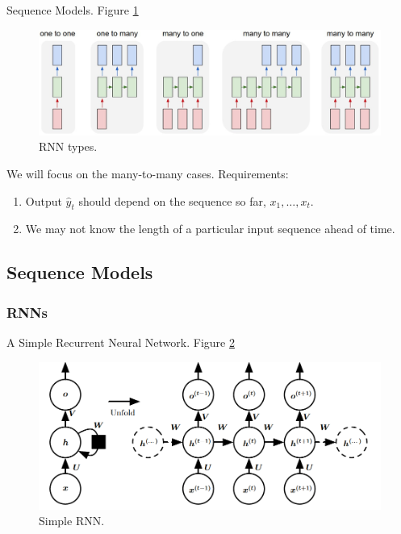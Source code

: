 \documentclass[english]{article}
\begin{document}
 

\item 
 {Sequence Models}.  Figure \ref{rnn-types}

\begin{figure}
  \centering
\includegraphics[width=0.9\linewidth]{rnn-types.png}
    \caption{RNN types.}
    \label{rnn-types}
\end{figure}
We will focus on the many-to-many cases. Requirements:
\begin{enumerate}
\item Output $\hat{y}_t$ should depend on the sequence so far, $x_1,\dots,x_t$.
\item We may not know the length of a particular input sequence ahead of time.
\end{enumerate}
\eenum

\subsection{Sequence Models}
\subsubsection{RNNs} %
\benum
\item 
 {A Simple Recurrent Neural Network}.  Figure \ref{Simple RNN}

\begin{figure}
  \centering
\includegraphics[width=0.8\linewidth]{rnn.png}
    \caption{Simple RNN.}
    \label{Simple RNN}
\end{figure}
\end{document}

